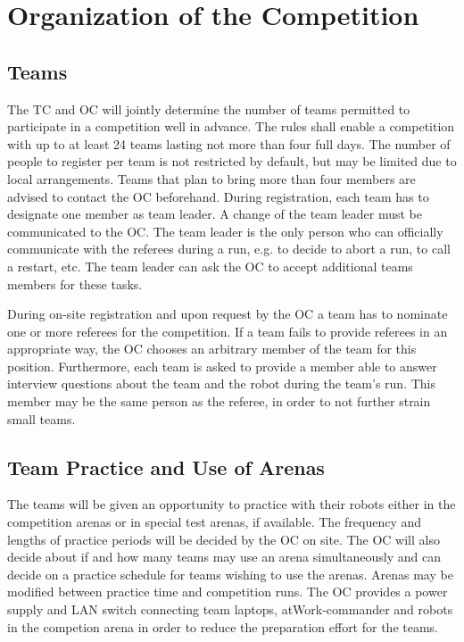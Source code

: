 
\section{Organization of the Competition}\label{sec:organization_of_the_competition}

\subsection{Teams}
The TC and OC will jointly determine the number of teams permitted to participate in a competition well in advance. The rules shall enable a competition with up to at least 24 teams lasting not more than four full days.
The number of people to register per team is not restricted by default, but may be limited due to local arrangements. Teams that plan to bring more than four members are advised to contact the OC beforehand.
During registration, each team has to designate one member as team leader. A change of the team leader must be communicated to the OC. The team leader is the only person who can officially communicate with the referees during a run, e.g. to decide to abort a run, to call a restart, etc. The team leader can ask the OC to accept additional teams members for these tasks.
\par
During on-site registration and upon request by the OC a team has to nominate one or more referees for the competition. If a team fails to provide referees in an appropriate way, the OC chooses an arbitrary member of the team for this position. Furthermore, each team is asked to provide a member able to answer interview questions about the team and the robot during the team's run. This member may be the same person as the referee, in order to not further strain small teams.


\subsection{Team Practice and Use of Arenas}
The teams will be given an opportunity to practice with their robots either in the competition arenas or in special test arenas, if available. The frequency and lengths of practice periods will be decided by the OC on site. The OC will also decide about if and how many teams may use an arena simultaneously and can decide on a practice schedule for teams wishing to use the arenas. Arenas may be modified between practice time and competition runs.
The OC provides a power supply and LAN switch connecting team laptops, atWork-commander and robots in the competion arena in order to reduce
the preparation effort for the teams.




